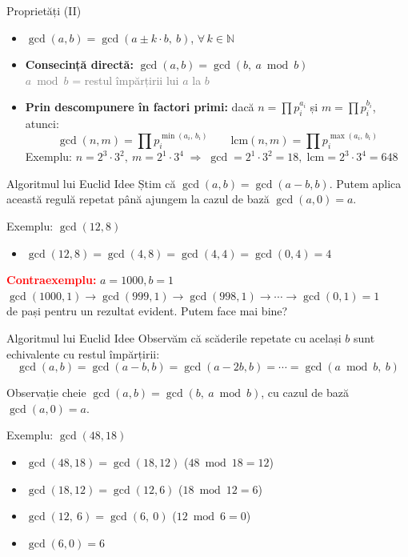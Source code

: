 ﻿\documentclass{beamer}
\begin{document}
\begin{frame}{Proprietăți (II)}
  \begin{itemize}
    \item $\gcd(a, b) = \gcd(a \pm k \cdot b,\ b)$, $\forall\, k \in \mathbb{N}$
    \item \textbf{Consecință directă:} $\gcd(a, b) = \gcd(b,\ a \bmod b)$ \\
      {\footnotesize\textcolor{gray}{$a \bmod b$ = restul împărțirii lui $a$ la $b$}}
    \item \textbf{Prin descompunere în factori primi:} dacă
      $n = \prod p_i^{a_i}$ și $m = \prod p_i^{b_i}$, atunci:
      \[
        \gcd(n, m) = \prod p_i^{\min(a_i,\, b_i)} \qquad
        \text{lcm}(n, m) = \prod p_i^{\max(a_i,\, b_i)}
      \]
      Exemplu: $n = 2^3 \cdot 3^2,\ m = 2^1 \cdot 3^4 \;\Rightarrow\;
        \gcd = 2^1 \cdot 3^2 = 18,\;
        \text{lcm} = 2^3 \cdot 3^4 = 648$
  \end{itemize}
\end{frame}

\begin{frame}{Algoritmul lui Euclid \textemdash{} Idee}
  Știm că $\gcd(a, b) = \gcd(a - b, b)$. Putem aplica această regulă repetat până ajungem la cazul de bază $\gcd(a, 0) = a$.
  \bigskip

  Exemplu: $\gcd(12, 8)$
  \begin{itemize}
    \item $\gcd(12, 8) = \gcd(4, 8) = \gcd(4, 4) = \gcd(0, 4) = 4$ \checkmark
  \end{itemize}
  \bigskip

  \begin{block}{\textbf{\textcolor{red}{Contraexemplu:}} $a = 1000, b = 1$}
    $\gcd(1000, 1) \rightarrow \gcd(999, 1) \rightarrow \gcd(998, 1) \rightarrow \cdots \rightarrow \gcd(0, 1) = 1$\\
     de pași pentru un rezultat evident. Putem face mai bine?
  \end{block}
\end{frame}

\begin{frame}{Algoritmul lui Euclid \textemdash{} Idee}
  Observăm că scăderile repetate cu același $b$ sunt echivalente cu restul împărțirii:
  \[
    \gcd(a, b) = \gcd(a - b, b) = \gcd(a - 2b, b) = \cdots = \gcd(a \bmod b,\ b)
  \]
  \begin{block}{Observație cheie}
    $\gcd(a, b) = \gcd(b,\ a \bmod b)$, \quad cu cazul de bază $\gcd(a, 0) = a$.
  \end{block}
  \bigskip
  Exemplu: $\gcd(48, 18)$
  \begin{itemize}
    \item $\gcd(48, 18) = \gcd(18, 12)$ \quad ($48 \bmod 18 = 12$)
    \item $\gcd(18, 12) = \gcd(12, 6)$  \quad ($18 \bmod 12 = 6$)
    \item $\gcd(12,\ 6) = \gcd(6,\ 0)$  \quad\; ($12 \bmod 6 = 0$)
    \item $\gcd(6, 0) = 6$ \checkmark
  \end{itemize}
\end{frame}
\end{document}
